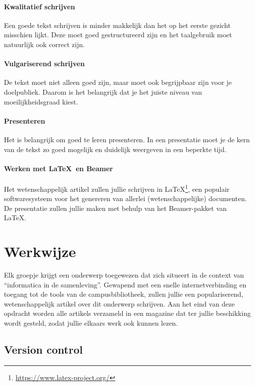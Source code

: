 \documentclass[a4paper]{article}
\begin{document}
\paragraph{Kwalitatief schrijven}
Een goede tekst schrijven is minder makkelijk dan het op het eerste gezicht misschien lijkt.
Deze moet goed gestructureerd zijn en het taalgebruik moet natuurlijk ook correct zijn.

\paragraph{Vulgariserend schrijven}
De tekst moet niet alleen goed zijn, maar moet ook begrijpbaar zijn voor je doelpubliek.
Daarom is het belangrijk dat je het juiste niveau van moeilijkheidsgraad kiest.

\paragraph{Presenteren}
Het is belangrijk om goed te leren presenteren.
In een presentatie moet je de kern van de tekst zo goed mogelijk en duidelijk weergeven in een beperkte tijd.

\paragraph{Werken met \LaTeX~en \textbf{Beamer}}
Het wetenschappelijk artikel zullen jullie schrijven in \LaTeX\footnote{\url{https://www.latex-project.org/}}, een populair softwaresysteem voor het genereren van allerlei (wetenschappelijke) documenten.
De presentatie zullen jullie maken met behulp van het Beamer-pakket van \LaTeX.


\section{Werkwijze}

Elk groepje krijgt een onderwerp toegewezen dat zich situeert in de context van ``informatica in de samenleving''.
Gewapend met een snelle internetverbinding en toegang tot de tools van de campusbibliotheek, zullen jullie een populariserend, wetenschappelijk artikel over dit onderwerp schrijven.
Aan het eind van deze opdracht worden alle artikels verzameld in een magazine dat ter jullie beschikking wordt gesteld, zodat jullie elkaars werk ook kunnen lezen.


\subsection{Version control}
\label{sec:version-control}
\end{document}
